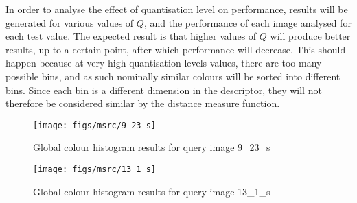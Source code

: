 In order to analyse the effect of quantisation level on performance, results will be generated for various values of $Q$, and the performance of each image analysed for each test value. The expected result is that higher values of $Q$ will produce better results, up to a certain point, after which performance will decrease. This should happen because at very high quantisation levels values, there are too many possible bins, and as such nominally similar colours will be sorted into different bins. Since each bin is a different dimension in the descriptor, they will not therefore be considered similar by the distance measure function.

\begin{figure}[ht]
	\begin{minipage}[]{0.3\linewidth}
		\centering
		\texttt{[image: figs/msrc/9\_23\_s]}
	\end{minipage}
	\begin{minipage}[]{0.7\linewidth}
		\centering
	\end{minipage}
	\caption{Global colour histogram results for query image 9\_23\_s}
	\label{fig:colour-hist-sheep}
\end{figure}

\begin{figure}[ht]
	\begin{minipage}[]{0.3\linewidth}
		\centering
		\texttt{[image: figs/msrc/13\_1\_s]}
	\end{minipage}
	\begin{minipage}[]{0.7\linewidth}
		\centering
	\end{minipage}
	\caption{Global colour histogram results for query image 13\_1\_s}
	\label{fig:colour-hist-books}
\end{figure}

